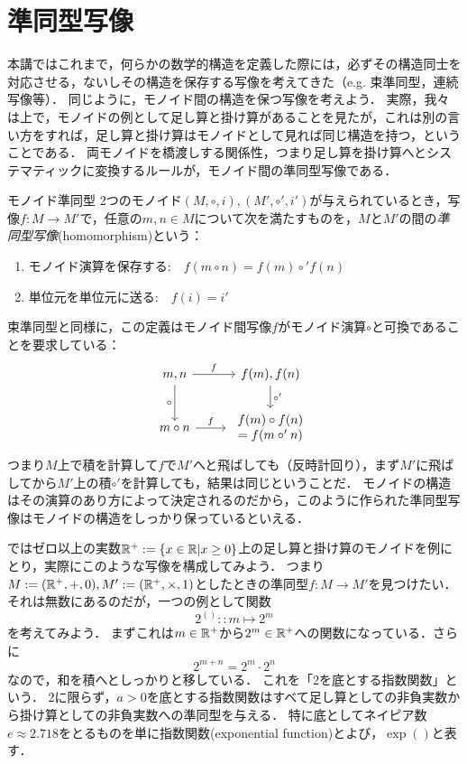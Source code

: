 \documentclass[11pt,a4paper, dvipdfmx]{jsarticle}
\begin{document}
\section{準同型写像}
本講ではこれまで，何らかの数学的構造を定義した際には，必ずその構造同士を対応させる，ないしその構造を保存する写像を考えてきた（e.g. 束準同型，連続写像等）．
同じように，モノイド間の構造を保つ写像を考えよう．
実際，我々は上で，モノイドの例として足し算と掛け算があることを見たが，これは別の言い方をすれば，足し算と掛け算はモノイドとして見れば同じ構造を持つ，ということである．
両モノイドを橋渡しする関係性，つまり足し算を掛け算へとシステマティックに変換するルールが，モノイド間の準同型写像である．

\begin{dfn}{モノイド準同型}{}
    2つのモノイド$(M, \circ, i), (M', \circ', i')$が与えられているとき，写像$f:M \to M'$で，任意の$m,n \in M$について次を満たすものを，$M$と$M'$の間の\emph{準同型写像}(homomorphism)という：
    \begin{enumerate}
        \item モノイド演算を保存する: $\ \ \ f(m \circ n) = f(m) \circ' f(n)$
        \item 単位元を単位元に送る: $\ \ \ f(i) = i'$
    \end{enumerate}
\end{dfn}

束準同型と同様に，この定義はモノイド間写像$f$がモノイド演算$\circ$と可換であることを要求している：
\[
\begin{tikzcd}
m, n \arrow{r}{f} \arrow[swap]{d}{\circ} 
& f(m), f(n) \arrow{d}{\circ'} \\
m \circ n \arrow{r}{f} 
& \begin{array}{c} f(m) \circ f(n) \\ = f(m \circ' n) \end{array}
\end{tikzcd}
\]
つまり$M$上で積を計算して$f$で$M'$へと飛ばしても（反時計回り），まず$M'$に飛ばしてから$M'$上の積$\circ'$を計算しても，結果は同じということだ．
モノイドの構造はその演算のあり方によって決定されるのだから，このように作られた準同型写像はモノイドの構造をしっかり保っているといえる．

ではゼロ以上の実数$\mathbb{R}^+ := \{x \in \mathbb{R} | x \geq 0 \}$上の足し算と掛け算のモノイドを例にとり，実際にこのような写像を構成してみよう．
つまり$M := (\mathbb{R}^+, +, 0), M' := (\mathbb{R}^+, \times, 1)$としたときの準同型$f:M \to M'$を見つけたい．
それは無数にあるのだが，一つの例として関数
\[ 2^{()} :: m \mapsto 2^m \]
を考えてみよう．
まずこれは$m \in \mathbb{R}^+$から$2^m \in \mathbb{R}^+$への関数になっている．さらに
\[ 2^{m + n} = 2^m \cdot 2^n \]
なので，和を積へとしっかりと移している．
これを「2を底とする指数関数」という．
2に限らず，$a>0$を底とする指数関数はすべて足し算としての非負実数から掛け算としての非負実数への準同型を与える．
特に底としてネイピア数$e\approx 2.718$をとるものを単に指数関数(exponential function)とよび，$\exp()$と表す．
\end{document}
